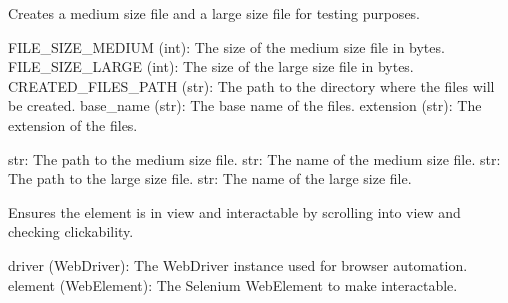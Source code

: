 \documentclass[letterpaper,10pt,english]{sphinxmanual}
\begin{document}
\begin{fulllineitems}
\label{\detokenize{utils:utils.file_management.create_testing_files}}
\pysigstartsignatures
{}
\pysigstopsignatures
\sphinxAtStartPar
Creates a medium size file and a large size file for testing purposes.
\begin{description}
\sphinxAtStartPar
FILE\_SIZE\_MEDIUM (int): The size of the medium size file in bytes.
FILE\_SIZE\_LARGE (int): The size of the large size file in bytes.
CREATED\_FILES\_PATH (str): The path to the directory where the files will be created.
base\_name (str): The base name of the files.
extension (str): The extension of the files.

\sphinxAtStartPar
str: The path to the medium size file.
str: The name of the medium size file.
str: The path to the large size file.
str: The name of the large size file.

\end{description}

\end{fulllineitems}


\begin{fulllineitems}
\label{\detokenize{utils:utils.file_management.ensure_element_interactable}}
\pysigstartsignatures
{}
\pysigstopsignatures
\sphinxAtStartPar
Ensures the element is in view and interactable by scrolling into view and checking clickability.
\begin{description}
\sphinxAtStartPar
driver (WebDriver): The WebDriver instance used for browser automation.
element (WebElement): The Selenium WebElement to make interactable.

\end{description}

\end{fulllineitems}
\end{document}
